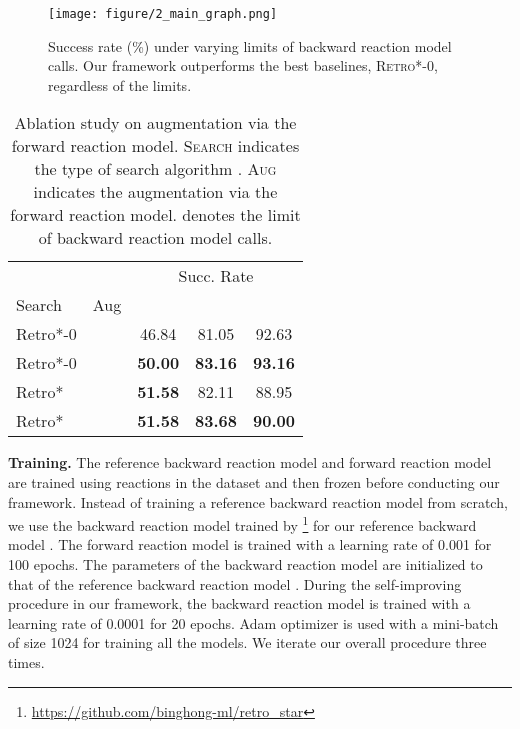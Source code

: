 \begin{table*}[ht!]
\begin{center}
\begin{sc}
{\begin{tabular}{l cc ccccc}
\bottomrule
\end{tabular}}
\end{sc}
\end{center}
\vskip -0.1in
\end{table*} \begin{figure}[t]
\vspace{0.1in}
    \centering
    \texttt{[image: figure/2\_main\_graph.png]}
    \caption{Success rate (\%) under varying limits of backward reaction model calls. Our framework outperforms the best baselines, \textsc{Retro*-0}, regardless of the limits.}
    \label{fig:main_graph}
\end{figure} \begin{table}[t]
\caption{Ablation study on augmentation via the forward reaction model. \textsc{Search} indicates the type of search algorithm . \textsc{Aug} indicates the augmentation via the forward reaction model.  denotes the limit of backward reaction model calls.} 
\label{tab:3_ablation_aug}
\vskip 0.1in
\begin{center}
\begin{sc}
\begin{tabular}{lc ccc}
\toprule
& &
\multicolumn{3}{c}{Succ. Rate } \\
\cmidrule(lr){3-5}
Search & Aug &  &  &  \\
\midrule
Retro*-0 &         & 46.84 & 81.05 & 92.63 \\
Retro*-0 &  & \textbf{50.00} & \textbf{83.16} & \textbf{93.16} \\
\midrule
Retro* &         & \textbf{51.58} & 82.11 & 88.95 \\
Retro* &  & \textbf{51.58} & \textbf{83.68} & \textbf{90.00} \\
\bottomrule
\end{tabular}
\end{sc}
\end{center}
\vskip -0.1in
\end{table} \textbf{Training.}
The reference backward reaction model  and forward reaction model  are trained using reactions in the dataset  and then frozen before conducting our framework. Instead of training a reference backward reaction model from scratch, we use the backward reaction model trained by \citet{chen2020retro}\footnote{\url{https://github.com/binghong-ml/retro\_star}} for our reference backward model . The forward reaction model  is trained with a learning rate of 0.001 for 100 epochs. The parameters of the backward reaction model  are initialized to that of the reference backward reaction model . 
During the self-improving procedure in our framework, the backward reaction model  is trained with a learning rate of 0.0001 for 20 epochs.
Adam optimizer \citep{kingma2014adam} is used with a mini-batch of size 1024 for training all the models. We iterate our overall procedure three times.











